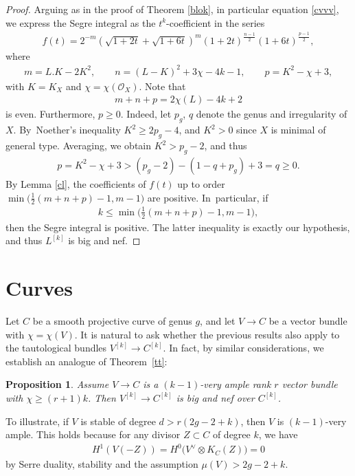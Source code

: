 \documentclass[10pt,a4paper]{amsart}
\numberwithin{equation}{section}
\newtheorem{Proposition}[Theorem]{Proposition}
 { \theoremstyle{definition}
\newtheorem{Definition}[Theorem]{Definition}
\newtheorem{Note}[Theorem]{Note}
\newtheorem{Example}[Theorem]{Example}
\newtheorem{Remark}[Theorem]{Remark} }
\begin{document}
\begin{proof}
Arguing as in the proof of Theorem \ref{blok}, in particular equation \eqref{cvvv}, we express the Segre integral as the $t^k$-coefficient in the series
\begin{gather*}
f(t)=2^{-m} \left(\sqrt{1+2t}+\sqrt{1+6t}\right)^m {(1+2t)}^{\frac{n-1}{2}} (1+6t)^{\frac{p-1}{2}},
\end{gather*}
where
\begin{gather*}
m=L.K-2K^2, \qquad n=(L-K)^2+3\chi - 4k - 1, \qquad p=K^2-\chi+3,
\end{gather*}
with $K=K_X$ and $\chi=\chi(\mathcal O_X)$. Note that
\begin{gather*}
m+n+p=2\chi(L)-4k+2
\end{gather*}
is even. Furthermore, $p\geq 0$. Indeed, let $p_g$, $q$ denote the genus and irregularity of $X$. By~Noet\-her's inequality $K^2\geq 2p_g-4$, and $K^2>0$ since $X$ is minimal of general type. Averaging, we obtain $K^2>p_g-2$, and thus
\begin{gather*}
p=K^2-\chi+3>(p_g-2)-(1-q+p_g)+3=q\geq 0.
\end{gather*}
By Lemma \ref{cl}, the coefficients of
$f(t)$ up to order $\min\big(\frac{1}{2} (m+n+p)-1, m-1\big)$ are positive. In~particular, if
\begin{gather*}
k\leq \min\bigg(\frac{1}{2} (m+n+p)-1, m-1\bigg),
\end{gather*}
then the Segre integral is positive. The latter inequality is exactly our hypothesis, and thus $L^{[k]}$ is big and nef.
\end{proof}

\section{Curves} \label{seccur} Let $C$ be a smooth projective curve of genus $g$, and let $V\to C$ be a vector bundle with $\chi=\chi(V)$. It is natural to ask whether the previous results also apply to the tautological bundles $V^{[k]}\to C^{[k]}$. In fact, by similar considerations, we establish an analogue of Theorem~\ref{tt}:

\begin{Proposition} \label{tt3}Assume $V\to C$ is a $(k-1)$-very ample rank $r$ vector bundle with $\chi \geq (r+1)k$.
Then $V^{[k]}\to C^{[k]}$ is big and nef over $C^{[k]}$.
\end{Proposition}

To illustrate, if $V$ is stable of degree $d>r(2g-2+k)$, then $V$ is $(k-1)$-very ample. This holds because for any divisor $Z\subset C$ of degree $k$, we have
\begin{gather*}
H^1(V(-Z))=H^0\big(V^{\vee}\otimes K_C(Z)\big)=0
\end{gather*}
by Serre duality, stability and the assumption $\mu(V)>2g-2+k$.
\end{document}
